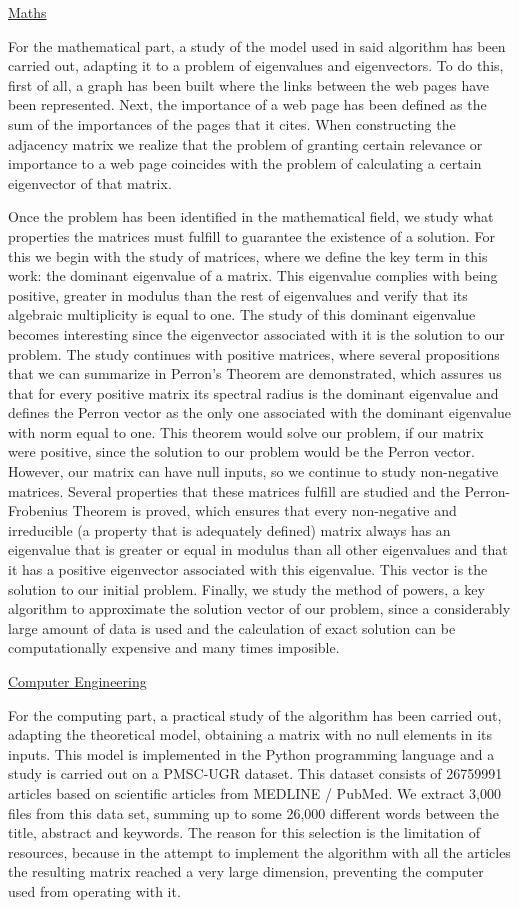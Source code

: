 \documentclass[size=a4, parskip=half, titlepage=false, toc=flat, toc=bib, 12pt, twoside]{scrartcl}
\theoremstyle{theorem-style}
\theoremstyle{definition-style}
\theoremstyle{remark-style}
\theoremstyle{example-style}
\theoremstyle{definition-style}
\theoremstyle{remark-style}
\begin{document}
\underline{Maths}

For the mathematical part, a study of the model used in said algorithm has been carried out, adapting it to a problem of eigenvalues and eigenvectors. To do this, first of all, a graph has been built where the links between the web pages have been represented. Next, the importance of a web page has been defined as the sum of the importances of the pages that it cites. When constructing the adjacency matrix we realize that the problem of granting certain relevance or importance to a web page coincides with the problem of calculating a certain eigenvector of that matrix.

Once the problem has been identified in the mathematical field, we study what properties the matrices must fulfill to guarantee the existence of a solution. For this we begin with the study of matrices, where we define the key term in this work: the dominant eigenvalue of a matrix. This eigenvalue complies with being positive, greater in modulus than the rest of eigenvalues ​​and verify that its algebraic multiplicity is equal to one. The study of this dominant eigenvalue becomes interesting since the eigenvector associated with it is the solution to our problem. The study continues with positive matrices, where several propositions that we can summarize in Perron's Theorem are demonstrated, which assures us that for every positive matrix its spectral radius is the dominant eigenvalue and defines the Perron vector as the only one associated with the dominant eigenvalue with norm equal to one. This theorem would solve our problem, if our matrix were positive, since the solution to our problem would be the Perron vector. However, our matrix can have null inputs, so we continue to study non-negative matrices. Several properties that these matrices fulfill are studied and the Perron-Frobenius Theorem is proved, which ensures that every non-negative and irreducible (a property that is adequately defined) matrix always has an eigenvalue that is greater or equal in modulus than all other eigenvalues ​​and that it has a positive eigenvector associated with this eigenvalue. This vector is the solution to our initial problem. Finally, we study the method of powers, a key algorithm to approximate the solution vector of our problem, since a considerably large amount of data is used and the calculation of exact solution can be computationally expensive and many times imposible.

\underline{Computer Engineering}

For the computing part, a practical study of the algorithm has been carried out, adapting the theoretical model, obtaining a matrix with no null elements in its inputs. This model is implemented in the Python programming language and a study is carried out on a PMSC-UGR dataset. This dataset consists of 26759991 articles based on scientific articles from MEDLINE / PubMed. We extract 3,000 files from this data set, summing up to some 26,000 different words between the title, abstract and keywords. The reason for this selection is the limitation of resources, because in the attempt to implement the algorithm with all the articles the resulting matrix reached a very large dimension, preventing the computer used from operating with it.
\end{document}
